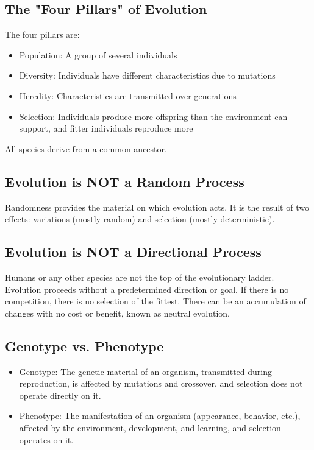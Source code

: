 \subsection*{The "Four Pillars" of Evolution}
The four pillars are:
\begin{itemize}
    \item  Population: A group of several individuals
    \item  Diversity: Individuals have different characteristics due to mutations
    \item  Heredity: Characteristics are transmitted over generations
    \item  Selection: Individuals produce more offspring than the environment can support, and fitter individuals reproduce more
\end{itemize}
All species derive from a common ancestor.

\subsection*{Evolution is NOT a Random Process}
Randomness provides the material on which evolution acts. It is the result of two effects: variations (mostly random) and selection (mostly deterministic).

\subsection*{Evolution is NOT a Directional Process}
Humans or any other species are not the top of the evolutionary ladder. Evolution proceeds without a predetermined direction or goal. If there is no competition, there is no selection of the fittest. There can be an accumulation of changes with no cost or benefit, known as neutral evolution.

\subsection*{Genotype vs. Phenotype}
\begin{itemize}
    \item  Genotype: The genetic material of an organism, transmitted during reproduction, is affected by mutations and crossover, and selection does not operate directly on it.
    \item  Phenotype: The manifestation of an organism (appearance, behavior, etc.), affected by the environment, development, and learning, and selection operates on it.
\end{itemize}

